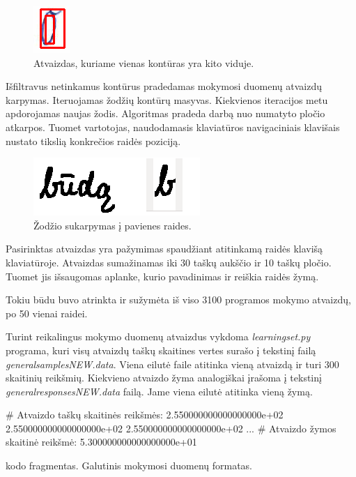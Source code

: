 \documentclass[a4paper,12pt]{article}
\begin{document}
		\begin{figure}[H]
			\centering
			\includegraphics[scale=0.5]{images/removecntrs}
			\caption{Atvaizdas, kuriame vienas kontūras yra kito viduje.}   %
			\label{img:removecntrs}
		\end{figure}
		

Išfiltravus netinkamus kontūrus pradedamas mokymosi duomenų atvaizdų karpymas. Iteruojamas žodžių kontūrų masyvas. Kiekvienos iteracijos metu apdorojamas naujas žodis. Algoritmas pradeda darbą nuo numatyto pločio atkarpos. Tuomet vartotojas, naudodamasis klaviatūros navigaciniais klavišais nustato tikslią konkrečios raidės poziciją.

		\begin{figure}[H]
			\centering
			\includegraphics[scale=0.5]{images/selectletter}
			\caption{Žodžio sukarpymas į pavienes raides.}   %
			\label{img:selectletter}
		\end{figure}
		
Pasirinktas atvaizdas yra pažymimas spaudžiant atitinkamą raidės klavišą klaviatūroje. Atvaizdas sumažinamas iki 30 taškų aukščio ir 10 taškų pločio. Tuomet jis išsaugomas aplanke, kurio pavadinimas ir reiškia raidės žymą.
 
Tokiu būdu buvo atrinkta ir sužymėta iš viso 3100 programos mokymo atvaizdų, po 50 vienai raidei. 

Turint reikalingus mokymo duomenų atvaizdus vykdoma \textit{learningset.py} programa, kuri visų atvaizdų taškų skaitines vertes surašo į tekstinį failą \textit{generalsamplesNEW.data}. Viena eilutė faile atitinka vieną atvaizdą ir turi 300 skaitinių reikšmių. Kiekvieno atvaizdo žyma analogiškai įrašoma į tekstinį \textit{generalresponsesNEW.data} failą. Jame viena eilutė atitinka vieną žymą.

	\begin{listing}[H]
\begin{pythoncode}
# Atvaizdo taškų skaitinės reikšmės:
2.550000000000000000e+02 2.550000000000000000e+02 2.550000000000000000e+02 ...
# Atvaizdo žymos skaitinė reikšmė:
5.300000000000000000e+01
\end{pythoncode}
	\caption{kodo fragmentas. Galutinis mokymosi duomenų formatas.}		
	\end{listing}
\end{document}

